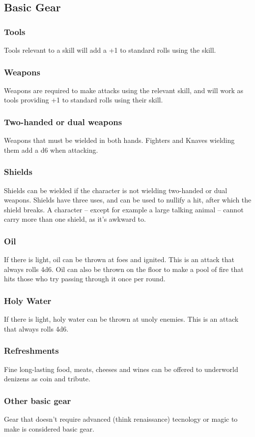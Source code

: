 \subsection{Basic Gear}
\begin{multicols}{2}
\subsubsection*{Tools}
Tools relevant to a skill will add a +1 to standard rolls using the skill.

\subsubsection*{Weapons}
Weapons are required to make attacks using the relevant skill, and will work as tools providing +1 to standard rolls using their skill.

\subsubsection*{Two-handed or dual weapons}
Weapons that must be wielded in both hands. Fighters and Knaves wielding them add a d6 when attacking.

\subsubsection*{Shields}
Shields can be wielded if the character is not wielding two-handed or dual weapons. Shields have three uses, and can be used to nullify a hit, after which the shield breaks. A character -- except for example a large talking animal -- cannot carry more than one shield, as it's awkward to.

\subsubsection*{Oil}
If there is light, oil can be thrown at foes and ignited. This is an attack that always rolls 4d6. Oil can also be thrown on the floor to make a pool of fire that hits those who try passing through it once per round.

\subsubsection*{Holy Water}
If there is light, holy water can be thrown at unoly enemies. This is an attack that always rolls 4d6.

\subsubsection*{Refreshments}
Fine long-lasting food, meats, cheeses and wines can be offered to underworld denizens as coin and tribute.

\subsubsection*{Other basic gear}
Gear that doesn't require advanced (think renaissance) tecnology or magic to make is considered basic gear.

\end{multicols}

